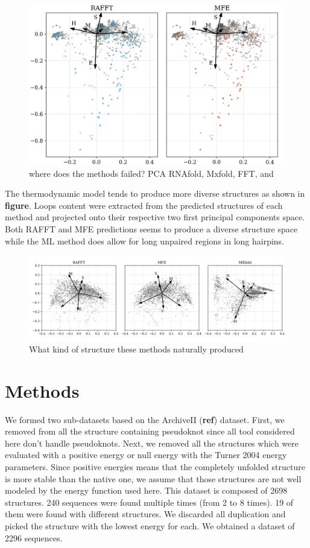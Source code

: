 \documentclass[a4paper,12pt]{article}
\begin{document}
{{\begin{figure}[htbp]
\centering
\includegraphics[width=.9\linewidth]{img/comp_fails.png}
\caption{where does the methods failed? PCA RNAfold, Mxfold, FFT, and}
\end{figure}

The thermodynamic model tends to produce more diverse structures as shown in
\textbf{figure}. Loops content were extracted from the predicted structures of each
method and projected onto their respective two first principal components space.
Both RAFFT and MFE predictions seems to produce a diverse structure space while
the ML method does allow for long unpaired regions in long hairpins.

\begin{figure}[htbp]
\centering
\includegraphics[width=.9\linewidth]{img/content_predicted_data.png}
\caption{What kind of structure these methods naturally produced}
\end{figure}

\section{Methods}
\label{sec:org483890c}
We formed two sub-datasets based on the ArchiveII (\textbf{ref}) dataset. First, we
removed from all the structure containing pseudoknot since all tool considered
here don't handle pseudoknots. Next, we removed all the structures which were
evaluated with a positive energy or null energy with the Turner 2004 energy
parameters. Since positive energies means that the completely unfolded structure
is more stable than the native one, we assume that those structures are not well
modeled by the energy function used here. This dataset is composed of 2698
structures. 240 sequences were found multiple times (from 2 to 8 times). 19 of
them were found with different structures. We discarded all duplication and
picked the structure with the lowest energy for each. We obtained a dataset of
2296 sequences.

}}
\end{document}
